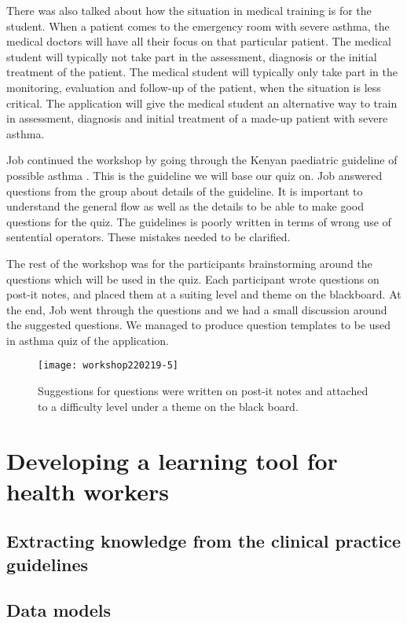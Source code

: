 \documentclass[a4paper,12pt]{book}
\begin{document}
 There was also talked about how the situation in medical training is for the student. When a patient comes to the emergency room with severe asthma, the medical doctors will have all their focus on that particular patient. The medical student will typically not take part in the assessment, diagnosis or the initial treatment of the patient. The medical student will typically only take part in the monitoring, evaluation and follow-up of the patient, when the situation is less critical. The application will give the medical student an alternative way to train in assessment, diagnosis and initial treatment of a made-up patient with severe asthma. 

Job continued the workshop by going through the Kenyan paediatric guideline of possible asthma \cite{RepublicofKeny2016}. This is the guideline we will base our quiz on. Job answered questions from the group about details of the guideline. It is important to understand the general flow as well as the details to be able to make good questions for the quiz. The guidelines is poorly written in terms of wrong use of sentential operators. These mistakes needed to be clarified.

The rest of the workshop was for the participants brainstorming around the questions which will be used in the quiz. Each participant wrote questions on post-it notes, and placed them at a suiting level and theme on the blackboard. At the end, Job went through the questions and we had a small discussion around the suggested questions. We managed to produce question templates to be used in asthma quiz of the application.

\begin{figure}[h]
	\caption {Suggestions for questions were written on post-it notes and attached to a difficulty level under a theme on the black board.}
	\texttt{[image: workshop220219-5]}
\end{figure}




\chapter{Developing a learning tool for health workers}
\section{Extracting knowledge from the clinical  practice guidelines}
\section{Data models}
\end{document}
